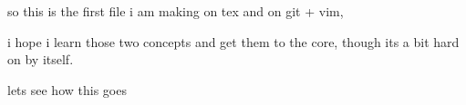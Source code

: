 so this is the first file i am making on tex and on git + vim,

i hope i learn those two concepts and get them to the core, though its a bit hard on by itself.

lets see how this goes 
